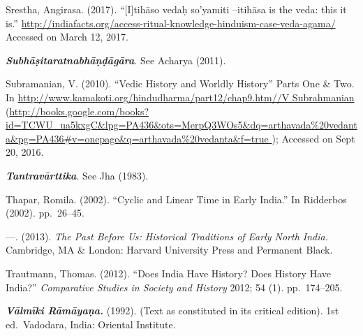 \begin{thebibliography}{99}
  Srestha, Angirasa. (2017). “[I]tihāso vedaḥ so’yamiti –itihāsa is the veda: this it is.” \url{http://indiafacts.org/access-ritual-knowledge-hinduism-case-veda-agama/} Accessed on March 12, 2017.

  \textbf{\textit{Subhāṣitaratnabhāṇḍāgāra}}. See Acharya (2011).

  Subramanian, V. (2010). “Vedic History and Worldly History” Parts One \& Two. In \url{http://www.kamakoti.org/hindudharma/part12/chap9.htm//V Subrahmanian} (\url{http://books.google.com/books?id=TCWU_ua5kxgC&lpg=PA436&ots=MerpQ3WOs5&dq=arthavada%
}); Accessed on Sept 20, 2016.

  \textbf{\textit{Tantravārttika}}. See Jha (1983).

  Thapar, Romila. (2002). “Cyclic and Linear Time in Early India.” In Ridderbos (2002). pp.~26--45.

  —. (2013). \textit{The Past Before Us: Historical Traditions of Early North India.} Cambridge, MA \& London: Harvard University Press and Permanent Black.

  Trautmann, Thomas. (2012). “Does India Have History? Does History Have India?” \textit{Comparative Studies in Society and History} 2012; 54 (1). pp.~174--205.

  \textbf{\textit{Vālmīki Rāmāyaṇa.}} (1992). (Text as constituted in its critical edition). 1st ed.\ Vadodara, India: Oriental Institute.

 \end{thebibliography}

\theendnotes

